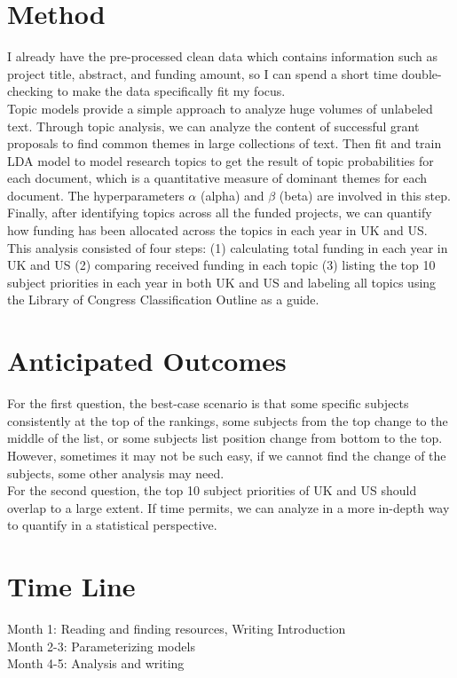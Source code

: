 \documentclass[a4paper,12pt]{article}
\begin{document}
	\section{Method}
    
    I already have the pre-processed clean data which contains information such as project title, abstract, and funding amount, so I can spend a short time double-checking to make the data specifically fit my focus.\\

    Topic models provide a simple approach to analyze huge volumes of unlabeled text. \cite{jelodar2019latent}Through topic analysis, we can analyze the content of successful grant proposals to find common themes in large collections of text. Then fit and train LDA model to model research topics to get the result of topic probabilities for each document, which is a quantitative measure of dominant themes for each document. The hyperparameters $\alpha$ (alpha) and $\beta$ (beta) are involved in this step.\cite{Topic-Analysis:-The-Ultimate-Guide-https://monkeylearn.com/topic-analysis/} Finally, after identifying topics across all the funded projects, we can quantify how funding has been allocated across the topics in each year in UK and US. This analysis consisted of four steps: (1) calculating total funding in each year in UK and US (2) comparing received funding in each topic (3) listing the top 10 subject priorities in each year in both UK and US and labeling all topics using the Library of Congress Classification Outline as a guide. 
    \\



	\section{Anticipated Outcomes}
	For the first question, the best-case scenario is that some specific subjects consistently at the top of the rankings, some subjects from the top change to the middle of the list, or some subjects list position change from bottom to the top. However, sometimes it may not be such easy, if we cannot find the change of the subjects, some other analysis may need. \\
    \indent For the second question, the top 10 subject priorities of UK and US should overlap to a large extent. If time permits, we can analyze in a more in-depth way to quantify in a statistical perspective.\\
	
	\section{Time Line}
	\noindent
    Month 1: Reading and finding resources, Writing Introduction\\
    Month 2-3: Parameterizing models\\
    Month 4-5: Analysis and writing\\
\end{document}
